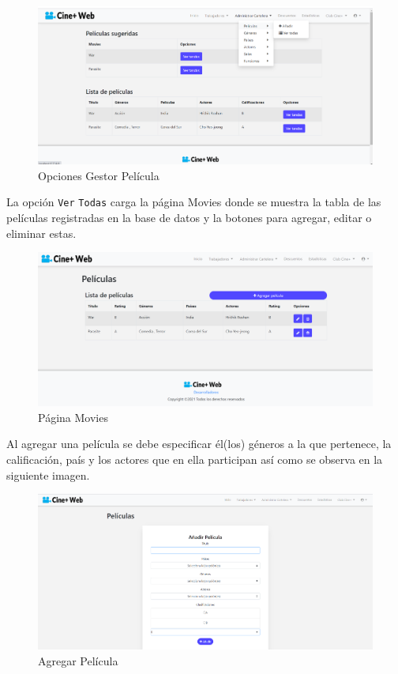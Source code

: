 \begin{figure}[h!]
	\centering
	\includegraphics[scale=0.35]{./chapters/img/movie_option.png}
	
	\label{fig:movie_option}
	\caption{Opciones Gestor Pel\'icula}
	
\end{figure}
La opci\'on \verb*|Ver| \verb*|Todas| carga la p\'agina Movies donde se muestra la tabla de las pel\'iculas registradas en la base de datos y la botones para agregar, editar o eliminar estas.

\begin{figure}[h!]
	\centering
	\includegraphics[scale=0.35]{./chapters/img/movies_table.png}
	
	\label{fig:movie_table}
	\caption{P\'agina Movies}
	
\end{figure}

Al agregar una pel\'icula se debe especificar \'el(los) g\'eneros a la que pertenece, la calificaci\'on, pa\'is y los actores que en ella participan as\'i como se observa en la siguiente imagen.

\begin{figure}[h!]
	\centering
	\includegraphics[scale=0.35]{./chapters/img/add_movie.png}
	
	\label{fig:add_movie}
	\caption{Agregar Pel\'icula}
	
\end{figure}

